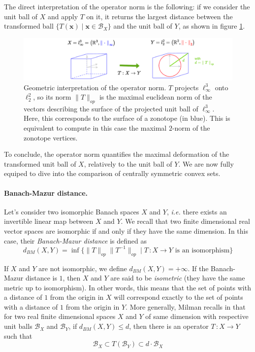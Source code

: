 The direct interpretation of the operator norm is the following: if we consider the unit ball of $X$ and apply $T$ on it, it returns the largest distance between the transformed ball $\{T(\mathbf{x}) \mid \mathbf{x}\in \mathcal{B}_X\}$ and the unit ball of $Y$, as shown in figure \ref{fig:operator_norm}.
\begin{figure}[!htb]
    \captionsetup{justification=centering}
        \centering
        \includegraphics[trim={150 0 70 0},clip, width=1\linewidth]{img/chapter_3/operator_norm.pdf}
    \caption{Geometric interpretation of the operator norm. $T$ projects $\ell_{\infty}^3$ onto $\ell_2^2$, so its norm $\|T\|_{op}$ is the maximal euclidean norm of the vectors describing the surface of the projected unit ball of $\ell_{\infty}^3$. Here, this corresponds to the surface of a zonotope (in blue). This is equivalent to compute in this case the maximal $2$-norm of the zonotope vertices.}
    \label{fig:operator_norm}
\end{figure}

To conclude, the operator norm quantifies the maximal deformation of the transformed unit ball of $X$, relatively to the unit ball of $Y$. We are now fully equiped to dive into the comparison of centrally symmetric convex sets.

\paragraph*{Banach-Mazur distance.} Let's consider two isomorphic Banach spaces $X$ and $Y$, \emph{i.e.} there exists an invertible linear map between $X$ and $Y$. We recall that two finite dimensional real vector spaces are isomorphic if and only if they have the same dimension. In this case, their \emph{Banach-Mazur distance} is defined as 
$$d_{BM}(X,Y) = \inf\{\|T\|_{op} \|T^{-1}\|_{op} \mid T\,\colon X\rightarrow Y \text{  is an isomorphism}\}$$

If $X$ and $Y$ are not isomorphic, we define $d_{BM}(X,Y) = +\infty$.
If the Banach-Mazur distance is $1$, then $X$ and $Y$ are said to be \emph{isometric} (they have the same metric up to isomorphism). In other words, this means that the set of points with a distance of $1$ from the origin in $X$ will correspond exactly to the set of points with a distance of $1$ from the origin in $Y$. More generally, Milman recalls in \cite{milmanDvoretzkyTheoremThirtyYearsLater1992} that for two real finite dimensional spaces $X$ and $Y$ of same dimension with respective unit balls $\mathcal{B}_X$ and $\mathcal{B}_Y$, if $d_{BM}(X,Y) \leq d$, then there is an operator $T\,\colon X\rightarrow Y$ such that
$$\mathcal{B}_X\subset T(\mathcal{B}_Y)\subset d\cdot \mathcal{B}_X$$

